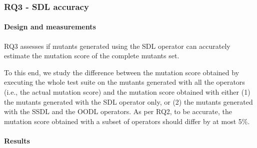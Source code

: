 \subsubsection{RQ3 - SDL accuracy}



\paragraph{Design and measurements}


RQ3 assesses if mutants generated using the SDL operator can accurately estimate the mutation score of the complete mutants set.

To this end, we study the difference between the mutation score obtained by executing the whole test suite on the mutants generated with all the operators (i.e., the actual mutation score) and the mutation score obtained with either (1) the mutants generated with the SDL operator only, or (2) the mutants generated with the SSDL and the OODL operators.
As per RQ2, to be accurate, the mutation score obtained with a subset of operators should differ by at most 5\%.




\paragraph{Results}



